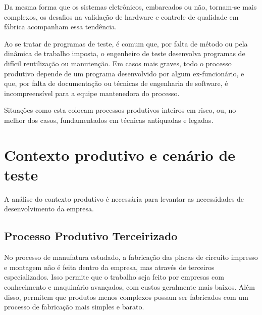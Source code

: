     Da mesma forma que os sistemas eletrônicos, embarcados ou não, tornam-se mais complexos, os desafios na validação de hardware e controle de qualidade em fábrica acompanham essa tendência. 
    
    Ao se tratar de programas de teste, é comum que, por falta de método ou pela dinâmica de trabalho imposta, o engenheiro de teste desenvolva programas de difícil reutilização ou manutenção. Em casos mais graves, todo o processo produtivo depende de um programa desenvolvido por algum ex-funcionário, e que, por falta de documentação ou técnicas de engenharia de software, é incompreensível para a equipe mantenedora do processo. 
    
    Situações como esta colocam processos produtivos inteiros em risco, ou, no melhor dos casos, fundamentados em técnicas antiquadas e legadas.
      


\section{Contexto produtivo e cenário de teste}



A análise do contexto produtivo é necessária para levantar as necessidades de desenvolvimento da empresa.

    \subsection{Processo Produtivo Terceirizado}
        No processo de manufatura estudado, a fabricação das placas de circuito impresso e montagem não é feita dentro da empresa, mas através de terceiros especializados. Isso permite que o trabalho seja feito por empresas com conhecimento e maquinário avançados, com custos geralmente mais baixos. Além disso, permitem que produtos menos complexos possam ser fabricados com um processo de fabricação mais simples e barato.
        
